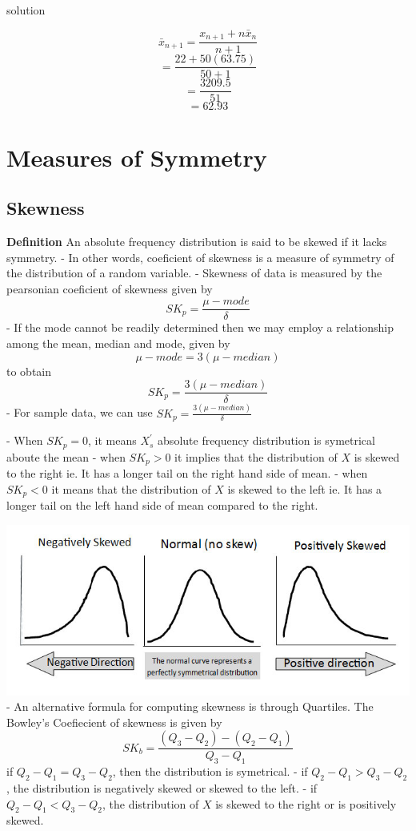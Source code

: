 \documentclass[12pt,a4paper]{article}
\begin{document}
solution



\begin{center}
    \[\bar{x}_{n + 1} = \frac{x_{n+1} + n\bar{x}_n}{n + 1}\]
    \[= \frac{22 + 50(63.75)}{50 + 1}\]
    \[= \frac{3209.5}{51}\]
    \[= 62.93\]
\end{center}


\section{Measures of Symmetry}
\subsection{Skewness}
\textbf{Definition} An absolute frequency distribution is said to be skewed if it lacks symmetry.
- In other words, coeficient of skewness is a measure of symmetry of the distribution of a random variable.
- Skewness of data is measured by the pearsonian coeficient of skewness given by
\begin{equation}
    SK_p = \frac{\mu - mode}{\delta}
\end{equation}
- If the mode cannot be readily determined then we may employ a relationship among the mean, median and mode, given by
\begin{equation}
    \mu - mode = 3(\mu - median)
\end{equation}
to obtain
\begin{equation}
    SK_p = \frac{3(\mu - median)}{\delta}
\end{equation}
- For sample data, we can use $SK_p = \frac{3(\mu - median)}{\delta}$

- When $SK_p = 0$, it means $X_s^{'}$ absolute frequency distribution is symetrical aboute the mean
- when $SK_p > 0$ it implies that the distribution of $X$ is skewed to the right ie. It has a longer tail on the right hand side of mean.
- when $SK_p < 0$ it means that the distribution of $X$ is skewed to the left ie. It has a longer tail on the left hand side of mean compared to the right.

\hbox{\includegraphics[width=\textwidth]{measure-of-skewness.jpg}}
- An alternative formula for computing skewness is through Quartiles. The Bowley's Coefiecient of skewness is given by
\begin{equation}
    SK_b = \frac{(Q_3 - Q_2)-(Q_2 - Q_1)}{Q_3 - Q_1}
\end{equation}
if $Q_2 - Q_1 = Q_3 - Q_2$, then the distribution is symetrical.
- if $Q_2 - Q_1 > Q_3 - Q_2$, the distribution is negatively skewed or skewed to the left.
- if $Q_2 - Q_1 < Q_3 - Q_2$, the distribution of $X$ is skewed to the right or is positively skewed.
\end{document}
